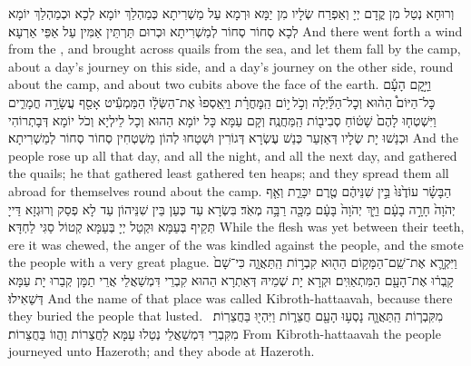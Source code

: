 {וְרוּחָא נְטַל מִן קֳדָם יְיָ וְאַפְרַח שְׂלָיו מִן יַמָּא וּרְמָא עַל מַשְׁרִיתָא כְּמַהְלַךְ יוֹמָא לְכָא וּכְמַהְלַךְ יוֹמָא לְכָא סְחוֹר סְחוֹר לְמַשְׁרִיתָא וּכְרוּם תַּרְתֵּין אַמִּין עַל אַפֵּי אַרְעָא׃}
{And there went forth a wind from the \lord, and brought across quails from the sea, and let them fall by the camp, about a day’s journey on this side, and a day’s journey on the other side, round about the camp, and about two cubits above the face of the earth.}{}
{וַיָּ֣קׇם הָעָ֡ם כׇּל־הַיּוֹם֩ הַה֨וּא וְכׇל־הַלַּ֜יְלָה וְכֹ֣ל \legarmeh  י֣וֹם הַֽמׇּחֳרָ֗ת וַיַּֽאַסְפוּ֙ אֶת־הַשְּׂלָ֔ו הַמַּמְעִ֕יט אָסַ֖ף עֲשָׂרָ֣ה חֳמָרִ֑ים וַיִּשְׁטְח֤וּ לָהֶם֙ שָׁט֔וֹחַ סְבִיב֖וֹת הַֽמַּחֲנֶֽה׃
}
{וְקָם עַמָּא כָּל יוֹמָא הַהוּא וְכָל לֵילְיָא וְכֹל יוֹמָא דְּבָתְרוֹהִי וּכְנַשׁוּ יָת שְׂלָיו דְּאַזְעַר כְּנַשׁ עֶשְׂרָא דְּגוֹרִין וּשְׁטַחוּ לְהוֹן מַשְׁטְחִין סְחוֹר סְחוֹר לְמַשְׁרִיתָא׃}
{And the people rose up all that day, and all the night, and all the next day, and gathered the quails; he that gathered least gathered ten heaps; and they spread them all abroad for themselves round about the camp.}{}
{הַבָּשָׂ֗ר עוֹדֶ֙נּוּ֙ בֵּ֣ין שִׁנֵּיהֶ֔ם טֶ֖רֶם יִכָּרֵ֑ת וְאַ֤ף יְהֹוָה֙ חָרָ֣ה בָעָ֔ם וַיַּ֤ךְ יְהֹוָה֙ בָּעָ֔ם מַכָּ֖ה רַבָּ֥ה מְאֹֽד׃
}
{בִּשְׂרָא עַד כְּעַן בֵּין שִׁנֵּיהוֹן עַד לָא פְסַק וְרוּגְזָא דַּייָ תְּקֵיף בְּעַמָּא וּקְטַל יְיָ בְּעַמָּא קְטוֹל סַגִּי לַחְדָּא׃}
{While the flesh was yet between their teeth, ere it was chewed, the anger of the \lord\space was kindled against the people, and the \lord\space smote the people with a very great plague.}{}
{וַיִּקְרָ֛א אֶת־שֵֽׁם־הַמָּק֥וֹם הַה֖וּא קִבְר֣וֹת הַֽתַּאֲוָ֑ה כִּי־שָׁם֙ קָֽבְר֔וּ אֶת־הָעָ֖ם הַמִּתְאַוִּֽים׃}
{וּקְרָא יָת שְׁמֵיהּ דְּאַתְרָא הַהוּא קִבְרֵי דִּמְשַׁאֲלֵי אֲרֵי תַמָּן קְבַרוּ יָת עַמָּא דְּשַׁאִילוּ׃}
{And the name of that place was called Kibroth-hattaavah, because there they buried the people that lusted.}{}
{מִקִּבְר֧וֹת הַֽתַּאֲוָ֛ה נָסְע֥וּ הָעָ֖ם חֲצֵר֑וֹת וַיִּהְי֖וּ בַּחֲצֵרֽוֹת׃ \petucha }
{מִקִּבְרֵי דִּמְשַׁאֲלֵי נְטַלוּ עַמָּא לַחֲצֵרוֹת וַהֲווֹ בַּחֲצֵרוֹת׃}
{From Kibroth-hattaavah the people journeyed unto Hazeroth; and they abode at Hazeroth.}{}
